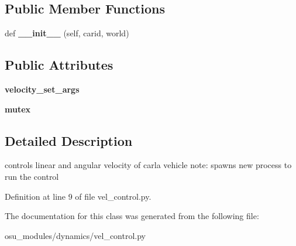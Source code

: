 \subsection*{Public Member Functions}
\begin{DoxyCompactItemize}
\item 
\mbox{\label{classscripts_1_1osu__modules_1_1dynamics_1_1vel__control_1_1VehicleVelocityControl_a9f588b8b52dd1053c2cd99baa942096f}} 
def {\bfseries \+\_\+\+\_\+init\+\_\+\+\_\+} (self, carid, world)
\end{DoxyCompactItemize}
\subsection*{Public Attributes}
\begin{DoxyCompactItemize}
\item 
\mbox{\label{classscripts_1_1osu__modules_1_1dynamics_1_1vel__control_1_1VehicleVelocityControl_a5681035d869e52b5552bff839ee931c7}} 
{\bfseries velocity\+\_\+set\+\_\+args}
\item 
\mbox{\label{classscripts_1_1osu__modules_1_1dynamics_1_1vel__control_1_1VehicleVelocityControl_a85fb6ebbaf312cb7236ac75bf9db6bf7}} 
{\bfseries mutex}
\end{DoxyCompactItemize}


\subsection{Detailed Description}
\begin{DoxyVerb}controls linear and angular velocity of carla vehicle
        note: spawns new process to run the control
\end{DoxyVerb}
 

Definition at line 9 of file vel\+\_\+control.\+py.



The documentation for this class was generated from the following file\+:\begin{DoxyCompactItemize}
\item 
osu\+\_\+modules/dynamics/vel\+\_\+control.\+py\end{DoxyCompactItemize}
